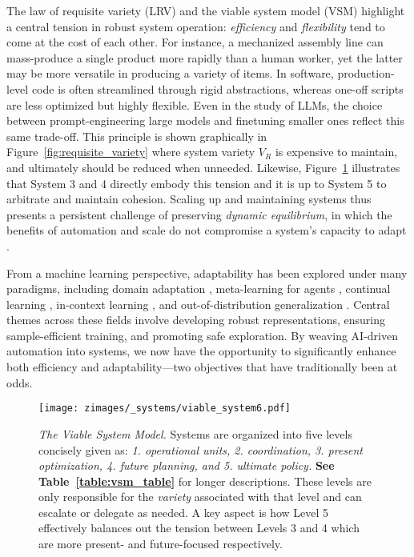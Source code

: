 The law of requisite variety (LRV) and the viable system model (VSM) highlight a central tension in robust system operation: \textit{efficiency} and \textit{flexibility} tend to come at the cost of each other. For instance, a mechanized assembly line can mass-produce a single product more rapidly than a human worker, yet the latter may be more versatile in producing a variety of items. In software, production-level code is often streamlined through rigid abstractions, whereas one-off scripts are less optimized but highly flexible. Even in the study of LLMs, the choice between prompt-engineering large models and finetuning smaller ones reflect this same trade-off. This principle is shown graphically in Figure~\ref{fig:requisite_variety} where system variety $V_R$ is expensive to maintain, and ultimately should be reduced when unneeded. Likewise, Figure~\ref{fig:viable_system} illustrates that System 3 and 4 directly embody this tension and it is up to System 5 to arbitrate and maintain cohesion. Scaling up and maintaining systems thus presents a persistent challenge of preserving \emph{dynamic equilibrium}, in which the benefits of automation and scale do not compromise a system’s capacity to adapt \cite{forrester1961industrial, holling1973resilience, sterman2000business}.

From a machine learning perspective, adaptability has been explored under many paradigms, including domain adaptation \cite{redko2022domainadaptationtheory}, meta-learning for agents \cite{beck2024metareinforcementlearning}, continual learning \cite{wang2024continuallearning}, in-context learning \cite{dong2024incontextlearning}, and out-of-distribution generalization \cite{liu2023outofdistribution}. Central themes across these fields involve developing robust representations, ensuring sample-efficient training, and promoting safe exploration. By weaving AI-driven automation into systems, we now have the opportunity to significantly enhance both efficiency and adaptability—two objectives that have traditionally been at odds.

\begin{figure}[ht]
    \centering
    \texttt{[image: zimages/\_systems/viable\_system6.pdf]}
    \caption{\textit{The Viable System Model.} Systems are organized into five levels concisely given as: \textit{1. operational units, 2. coordination, 3. present optimization, 4. future planning, and 5. ultimate policy.} \textbf{See Table~\ref{table:vsm_table}} for longer descriptions. These levels are only responsible for the \textit{variety} associated with that level and can escalate or delegate as needed. A key aspect is how Level 5 effectively balances out the tension between Levels 3 and 4 which are more present- and future-focused respectively.}
    \label{fig:viable_system}
\end{figure}

